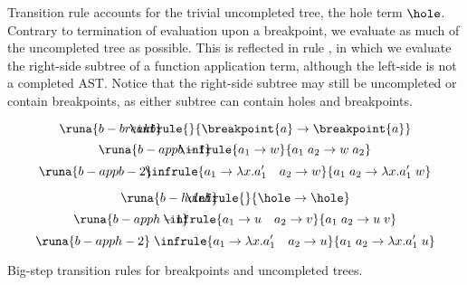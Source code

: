 Transition rule  accounts for the trivial uncompleted tree, the hole term $\hole$. Contrary to termination of evaluation upon a breakpoint, we evaluate as much of the uncompleted tree as possible. This is reflected in rule , in which we evaluate the right-side subtree of a function application term, although the left-side is not a completed AST. Notice that the right-side subtree may still be uncompleted or contain breakpoints, as either subtree can contain holes and breakpoints.
\vspace*{-1cm}
\begin{table}[H]
    \centering
    \begin{adjmulticols}{3}{-25pt}{-0.8in}
        \begin{equation*}
        \runa{b-breakb}\;\hspace{-1cm} \infrule{}{\breakpoint{a} \rightarrow \breakpoint{a}}
    \end{equation*}\break
    \vspace*{0.2cm}
    \begin{equation*}
        \runa{b-appb-1}\;\hspace{-1cm} \infrule{a_1 \rightarrow w}{a_1\; a_2 \rightarrow w\; a_2}
    \end{equation*}\break
    \vspace*{0.2cm}
    \begin{equation*}
        \runa{b-appb-2}\;\hspace{-0.3cm}\vspace{1.8cm} \infrule{a_1 \rightarrow \lambda x.a_1' \quad a_2 \rightarrow w}{a_1\; a_2 \rightarrow \lambda x.a_1'\; w}
    \end{equation*}
    \vspace*{-1.6cm}
    \end{adjmulticols}
    \vspace*{-1.9cm}
    \begin{adjmulticols}{3}{-25pt}{-0.8in}
    \begin{equation*}
        \runa{b-holeh}\;\hspace{-1cm}\vspace*{0.3cm} \infrule{}{\hole \rightarrow \hole}
    \end{equation*}\break
    \begin{equation*}
            \runa{b-apph-1}\;\hspace{-0.8cm} \infrule{a_1 \rightarrow u \quad a_2 \rightarrow v}{a_1\; a_2 \rightarrow u\; v}
    \end{equation*}\break
    \begin{equation*}
        \runa{b-apph-2}\;\vspace*{0.4cm} \infrule{a_1 \rightarrow \lambda x.a_1' \quad a_2 \rightarrow u}{a_1\; a_2 \rightarrow \lambda x.a_1'\; u}
    \end{equation*}
    \end{adjmulticols}
    \caption{Big-step transition rules for breakpoints and uncompleted trees.}
    \label{tab:big-step-ast-partial}
\end{table}
